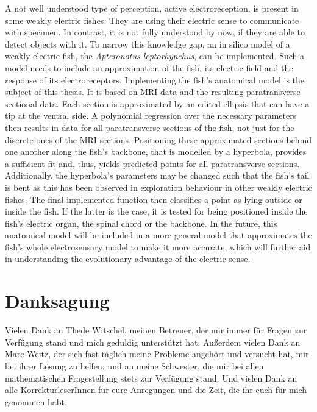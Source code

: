 \documentclass[twoside,12pt,a4paper]{report}
\begin{document}
A not well understood type of perception, active electroreception, is present in some weakly electric fishes. They are using their electric sense to communicate with specimen. In contrast, it is not fully understood by now, if they are able to detect objects with it. To narrow this knowledge gap, an in silico model of a weakly electric fish, the \textit{Apteronotus leptorhynchus}, can be implemented. Such a model needs to include an approximation of the fish, its electric field and the response of its electroreceptors. Implementing the fish's anatomical model is the subject of this thesis. It is based on MRI data and the resulting paratransverse sectional data. Each section is approximated by an edited ellipsis that can have a tip at the ventral side. A polynomial regression over the necessary parameters then results in data for all paratransverse sections of the fish, not just for the discrete ones of the MRI sections. Positioning these approximated sections behind one another along the fish's backbone, that is modelled by a hyperbola, provides a sufficient fit and, thus, yields predicted points for all paratransverse sections. Additionally, the hyperbola's parameters may be changed such that the fish's tail is bent as this has been observed in exploration behaviour in other weakly electric fishes. The final implemented function then classifies a point as lying outside or inside the fish. If the latter is the case, it is tested for being positioned inside the fish's electric organ, the spinal chord or the backbone. In the future, this anatomical model will be included in a more general model that approximates the fish's whole electrosensory model to make it more accurate, which will further aid in understanding the evolutionary advantage of the electric sense. 

\newpage
\section*{Danksagung}

Vielen Dank an Thede Witschel, meinen Betreuer, der mir immer für Fragen zur Verfügung stand und mich geduldig unterstützt hat. Außerdem vielen Dank an Marc Weitz, der sich fast täglich meine Probleme angehört und versucht hat, mir bei ihrer Lösung zu helfen; und an meine Schwester, die mir bei allen mathematischen Fragestellung stets zur Verfügung stand. Und vielen Dank an alle KorrekturleserInnen für eure Anregungen und die Zeit, die ihr euch für mich genommen habt. 


\newpage
\renewcommand{\baselinestretch}{1.3}
\small\normalsize
\end{document}
